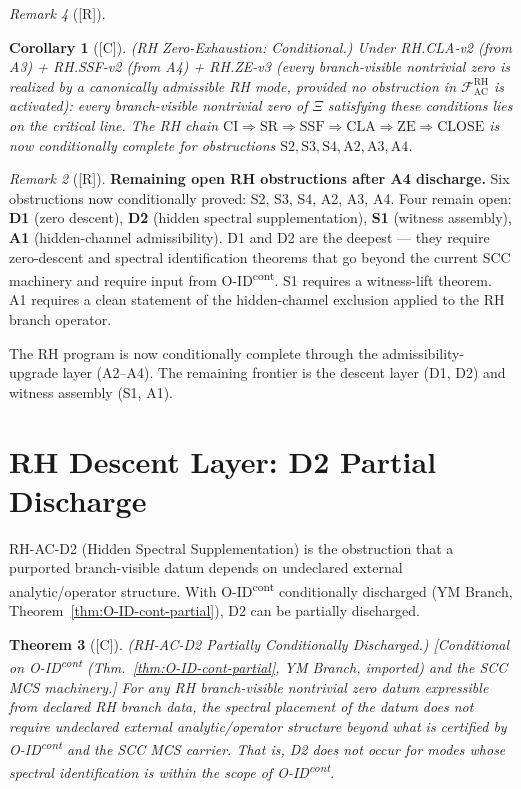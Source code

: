 \documentclass[12pt,oneside]{amsbook}
\theoremstyle{plain}
\newtheorem{theorem}{Theorem}[section]
\newtheorem{corollary}[theorem]{Corollary}
\theoremstyle{definition}
\theoremstyle{remark}
\newtheorem{remark}[theorem]{Remark}
\newcommand{\status}[1]{\textup{[#1]}}
\begin{document}
\begin{remark}[\status{R}]
\begin{corollary}[\status{C}]\label{cor:rh-ze-conditional}
\textup{(RH Zero-Exhaustion: Conditional.)}
Under RH.CLA-v2 (from A3) + RH.SSF-v2 (from A4) + RH.ZE-v3
(every branch-visible nontrivial zero is realized by a
canonically admissible RH mode, provided no obstruction in
$\mathcal{F}^{\mathrm{RH}}_{\mathrm{AC}}$ is activated):
every branch-visible nontrivial zero of $\Xi$ satisfying these
conditions lies on the critical line. The RH chain
$\mathrm{CI}\Rightarrow\mathrm{SR}\Rightarrow\mathrm{SSF}
\Rightarrow\mathrm{CLA}\Rightarrow\mathrm{ZE}\Rightarrow
\mathrm{CLOSE}$ is now conditionally complete for obstructions
$\mathrm{S2,S3,S4,A2,A3,A4}$.
\end{corollary}

\begin{remark}[\status{R}]\label{rem:rh-remaining}
\textbf{Remaining open RH obstructions after A4 discharge.}
Six obstructions now conditionally proved:
S2, S3, S4, A2, A3, A4.
Four remain open:
\textbf{D1} (zero descent), \textbf{D2} (hidden spectral
supplementation), \textbf{S1} (witness assembly),
\textbf{A1} (hidden-channel admissibility).
D1 and D2 are the deepest --- they require zero-descent and
spectral identification theorems that go beyond the current
SCC machinery and require input from O-ID\textsuperscript{cont}.
S1 requires a witness-lift theorem.
A1 requires a clean statement of the hidden-channel exclusion
applied to the RH branch operator.

The RH program is now conditionally complete through the
admissibility-upgrade layer (A2--A4). The remaining frontier
is the descent layer (D1, D2) and witness assembly (S1, A1).
\end{remark}



\section{RH Descent Layer: D2 Partial Discharge}
\label{sec:rh-d2}

RH-AC-D2 (Hidden Spectral Supplementation) is the obstruction that
a purported branch-visible datum depends on undeclared external
analytic/operator structure. With O-ID\textsuperscript{cont}
conditionally discharged (YM Branch,
Theorem~\ref{thm:O-ID-cont-partial}), D2 can be partially discharged.

\begin{theorem}[\status{C}]\label{thm:rh-ac-d2}
\textup{(RH-AC-D2 Partially Conditionally Discharged.)}
\textup{[Conditional on O-ID\textsuperscript{cont}
(Thm.~\ref{thm:O-ID-cont-partial}, YM Branch, imported) and
the SCC MCS machinery.]}
For any RH branch-visible nontrivial zero datum expressible from
declared RH branch data, the spectral placement of the datum does
not require undeclared external analytic/operator structure beyond
what is certified by O-ID\textsuperscript{cont} and the SCC MCS
carrier. That is, D2 does not occur for modes whose spectral
identification is within the scope of O-ID\textsuperscript{cont}.
\end{theorem}


\end{remark}
\end{document}
